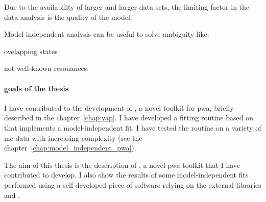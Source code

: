     Due to the availability of larger and larger data sets, the limiting factor in the data analysis is the quality of the model.


    Model-independent analysis can be useful to solve ambiguity like:

    ovelapping states

    not well-known resonances.

    \paragraph{goals of the thesis}

    I have contributed to the development of , a novel toolkit for \ac{pwa}, briefly described in the chapter~\ref{chap:yap}.
    I have developed a fitting routine based on  that implements a model-independent fit.
    I have tested the routine on a variety of \ac{mc} data with increasing complexity (see the chapter~\ref{chap:model_independent_pwa}).





    The aim of this thesis is the description of , a novel \ac{pwa} toolkit that I have contributed to develop.
    I also show the results of some model-independent fits performed using a self-developed piece of software relying on the external libraries  and .


